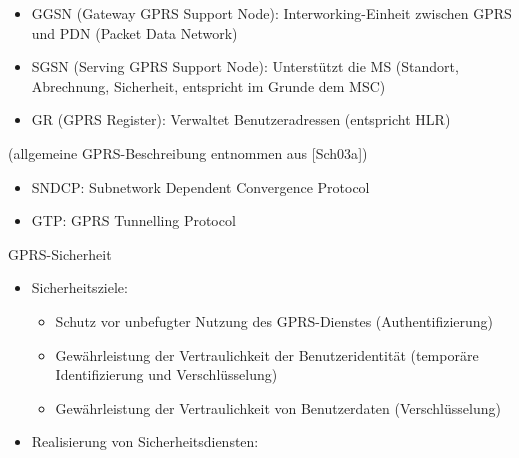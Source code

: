\documentclass[a4paper]{article}
\begin{document}
\begin{multicols}{3}
\begin{itemize}
              \begin{itemize}
                  \item
                        GGSN (Gateway GPRS Support Node): Interworking-Einheit zwischen GPRS
                        und PDN (Packet Data Network)
                  \item
                        SGSN (Serving GPRS Support Node): Unterstützt die MS (Standort,
                        Abrechnung, Sicherheit, entspricht im Grunde dem MSC)
                  \item
                        GR (GPRS Register): Verwaltet Benutzeradressen (entspricht HLR)
              \end{itemize}
    \end{itemize}

    (allgemeine GPRS-Beschreibung entnommen aus {[}Sch03a{]})



    \begin{itemize}
        \item
              SNDCP: Subnetwork Dependent Convergence Protocol
        \item
              GTP: GPRS Tunnelling Protocol
    \end{itemize}

    GPRS-Sicherheit

    \begin{itemize}
        \item
              Sicherheitsziele:

              \begin{itemize}
                  \item
                        Schutz vor unbefugter Nutzung des GPRS-Dienstes (Authentifizierung)
                  \item
                        Gewährleistung der Vertraulichkeit der Benutzeridentität (temporäre
                        Identifizierung und Verschlüsselung)
                  \item
                        Gewährleistung der Vertraulichkeit von Benutzerdaten
                        (Verschlüsselung)
              \end{itemize}
        \item
              Realisierung von Sicherheitsdiensten:


\end{itemize}
\end{multicols}
\end{document}
